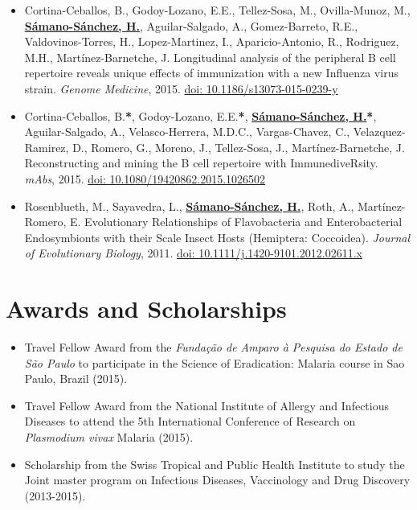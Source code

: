 \documentclass[11pt,a4paper,sans]{moderncv} %
\begin{document}
\begin{itemize}
  \item Cortina-Ceballos, B., Godoy-Lozano, E.E., Tellez-Sosa, M., Ovilla-Munoz, M., \textbf{\underline{S\'amano-S\'anchez, H.}}, Aguilar-Salgado, A., Gomez-Barreto, R.E., Valdovinos-Torres, H., Lopez-Martinez, I., Aparicio-Antonio, R., Rodriguez, M.H., Mart\'inez-Barnetche, J. Longitudinal analysis of the peripheral B cell repertoire reveals unique effects of immunization with a new Influenza virus strain. \textit{Genome Medicine}, 2015. \href{https://doi.org/10.1186/s13073-015-0239-y}{doi: 10.1186/s13073-015-0239-y}
  \item Cortina-Ceballos, B.\textbf{*}, Godoy-Lozano, E.E.\textbf{*}, \textbf{\underline{S\'amano-S\'anchez, H.}}\textbf{*}, Aguilar-Salgado, A., Velasco-Herrera, M.D.C., Vargas-Chavez, C., Velazquez-Ramirez, D., Romero, G., Moreno, J., Tellez-Sosa, J., Mart\'inez-Barnetche, J. Reconstructing and mining the B cell repertoire with ImmunediveRsity. \textit{mAbs}, 2015. \href{https://doi.org/10.1080/19420862.2015.1026502}{doi: 10.1080/19420862.2015.1026502}
  \item Rosenblueth, M., Sayavedra, L., \textbf{\underline{S\'amano-S\'anchez, H.}}, Roth, A., Mart\'inez-Romero, E. Evolutionary Relationships of Flavobacteria and Enterobacterial Endosymbionts with their Scale Insect Hosts (Hemiptera: Coccoidea). \textit{Journal of Evolutionary Biology}, 2011. \href{https://doi.org/10.1111/j.1420-9101.2012.02611.x}{doi: 10.1111/j.1420-9101.2012.02611.x}\\
\end{itemize}

\section{Awards and Scholarships}
\begin{itemize}
  \item Travel Fellow Award from the \textit{Funda\c c\~ao de Amparo \`a Pesquisa do Estado de S\~ao Paulo} to participate in the Science of Eradication: Malaria course in Sao Paulo, Brazil (2015).
  \item Travel Fellow Award from the National Institute of Allergy and Infectious Diseases to attend the 5th International Conference of Research on \textit{Plasmodium vivax} Malaria (2015).
  \item Scholarship from the Swiss Tropical and Public Health Institute to study the Joint master program on Infectious Diseases, Vaccinology and Drug Discovery (2013-2015).\\
\end{itemize}
\end{document}
